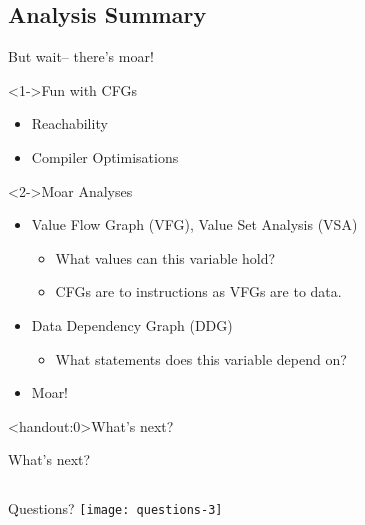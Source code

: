 \documentclass[xcolor={dvipsnames}]{beamer}
\begin{document}
\subsection{Analysis Summary}
\begin{frame}[fragile]{But wait-- there's moar!}
    \begin{block}<1->{Fun with CFGs}
        \begin{itemize}
            \item Reachability
            \item Compiler Optimisations
        \end{itemize}
    \end{block}
    \begin{block}<2->{Moar Analyses}
        \begin{itemize}
            \item<2-> Value Flow Graph (VFG), Value Set Analysis (VSA)
                  \begin{itemize}
                      \item What values can this variable hold?
                      \item CFGs are to instructions as VFGs are to data.
                  \end{itemize}
            \item<3-> Data Dependency Graph (DDG)
                  \begin{itemize}
                      \item What statements does this variable depend on?
                  \end{itemize}
            \item<4-> Moar!
        \end{itemize}
    \end{block}
\end{frame}
\begin{frame}<handout:0>{What's next?}
\end{frame}
\begin{frame}[noframenumbering]{What's next?}
\end{frame}

\subsection{}
\begin{frame}{Questions?}
    \centering
    \texttt{[image: questions-3]}
\end{frame}
\end{document}
